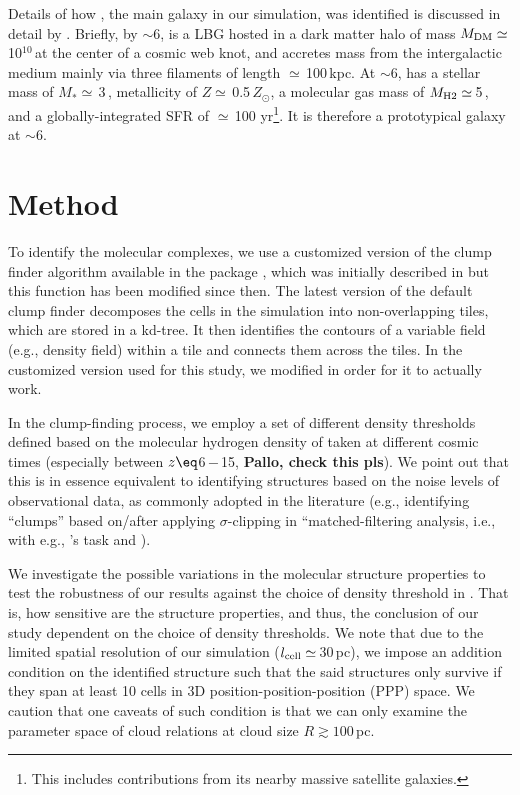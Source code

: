 \documentclass[apj]{emulateapj} %
\begin{document}
Details of how \flower, the main galaxy in our simulation,
was identified is discussed in detail by \citet{Pallottini17a}.
Briefly, by \z$\sim$6, \flower is a LBG hosted in 
a dark matter halo of mass $M_{\rm DM}\simeq$\,10$^{10}$\,\Msun at the center of a cosmic web knot, and 
accretes mass from the intergalactic medium mainly via three filaments of length $\simeq$\,100\,kpc.
At \z$\sim$6, \flower has a stellar mass of $M_*\simeq$\,3\,\Msun,
metallicity of $Z\simeq$\,0.5\,$Z_{\odot}$,
a molecular gas mass of $M_{\rm H2}\simeq$\,5\,\Msun,
and a globally-integrated SFR of $\simeq$\,100\,\Msun\,yr\pmOne\footnote{This includes contributions from its nearby massive satellite galaxies.}.
It is therefore a prototypical galaxy at \z$\sim$6.



\section{Method} \label{sec:method}

To identify the molecular complexes, we use a customized version of the clump finder algorithm 
available in the  package , which was initially described in \citet{Smith09a}
but this function has been modified since then.
The latest version of the default  clump finder decomposes the cells in the simulation
into non-overlapping tiles, which are stored in a kd-tree.
It then identifies the contours of a variable field (e.g., density field) within a tile and connects them across 
the tiles. In the customized version used for this study, we modified  in order for it to actually work.

In the clump-finding process, we employ a set of different density thresholds defined based on the
molecular hydrogen density of \flower taken at different cosmic times (especially between $z\eq$6\,$-$\,15, {\bf Pallo, check this pls}).
We point out that this is in essence equivalent to identifying structures based on the noise levels of observational data,
as commonly adopted in the literature (e.g., identifying 
``clumps'' based on/after applying $\sigma$-clipping in 
``matched-filtering analysis, i.e., with e.g., 's task  and ).

We investigate the possible variations in the molecular structure properties to test 
the robustness of our results against the choice of density threshold in .
That is, how sensitive are the structure properties, and thus, the conclusion of our study
dependent on the choice of density thresholds.
We note that due to the limited spatial resolution of our simulation ($l_{\rm cell}\simeq$\,30\,pc), we 
impose an addition condition on the identified structure such that the said structures only survive if they
span at least 10 cells in 3D position-position-position (PPP) space. 
We caution that one caveats of such condition is that 
we can only examine the parameter space of cloud
relations at cloud size $R\gtrsim100$\,pc. 
\end{document}
